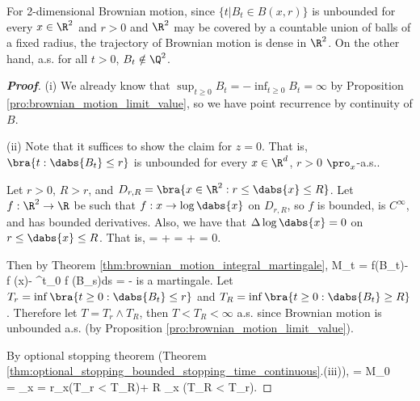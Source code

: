 \begin{remark}
For 2-dimensional Brownian motion, since $\{t | B_t \in B(x, r)\}$ is unbounded for every $x \in \R^2$ and $r > 0$ and $\R^2$ may be covered by a countable union of balls of a fixed radius, the trajectory of Brownian motion is dense in $\R^2$. On the other hand, a.s. for all $t > 0$, $B_t \notin \Q^2$.
\end{remark}

\begin{proof}[\bf Proof]
\ben
\item [(i)] We already know that $\sup_{t\geq 0} B_t = -\inf_{t\geq 0} B_t = \infty$ by Proposition \ref{pro:brownian_motion_limit_value}, so we have point recurrence by continuity of $B$.

\item [(ii)] Note that it suffices to show the claim for $z= 0$. That is, $\bra{t:\dabs{B_t} \leq r}$ is unbounded for every $x\in \R^d$, $r >0$ $\pro_x$-a.s..

Let $r > 0$, $R > r$, and $D_{r,R} = \bra{x \in \R^2 :r \leq \dabs{x} \leq R}$. Let $f : \R^2 \to \R$ be such that $f : x \to\log\dabs{x}$ on $D_{r,R}$, so $f$ is bounded, is $C^\infty$, and has bounded derivatives. Also, we have that $\Delta \log \dabs{x} = 0$ on $r\leq \dabs{x} \leq R$. %
That is,
\beast%
\Delta \log {} =   +   =  +  = 0.
\eeast

Then by Theorem \ref{thm:brownian_motion_integral_martingale},
\be
M_t = f(B_t)- f (x)- \int^t_0  \Delta f (B_s)ds = \log{} -\log{}
\ee
is a martingale. Let $T_r = \inf\bra{t \geq 0 :\dabs{B_t} \leq r}$ and $T_R = \inf\bra{t \geq 0: \dabs{B_t} \geq R}$. Therefore let $T = T_r \land T_R$, then $T < T_R < \infty$ a.s. since Brownian motion is unbounded a.s. (by Proposition \ref{pro:brownian_motion_limit_value}).

By optional stopping theorem (Theorem \ref{thm:optional_stopping_bounded_stopping_time_continuous}.(iii)),
\be
\E{} = M_0 \ \ra \ \log {} = \E_x = \log r\pro_x(T_r < T_R)+ \log R \pro_x (T_R < T_r).
\ee


\end{proof}
